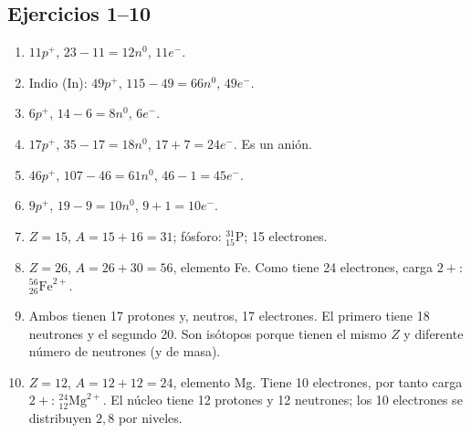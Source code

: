 \documentclass[12pt, letterpaper]{article}
\begin{document}
\subsection*{Ejercicios 1--10}
\begin{enumerate}[leftmargin=*, label=\textbf{\arabic*.}]
  \item $11p^+$, $23-11=12n^0$, $11e^-$.
  \item Indio (In): $49p^+$, $115-49=66n^0$, $49e^-$.
  \item $6p^+$, $14-6=8n^0$, $6e^-$.
  \item $17p^+$, $35-17=18n^0$, $17+7=24e^-$. Es un anión.
  \item $46p^+$, $107-46=61n^0$, $46-1=45e^-$.
  \item $9p^+$, $19-9=10n^0$, $9+1=10e^-$.
  \item $Z=15$, $A=15+16=31$; fósforo: $^{31}_{15}\mathrm{P}$; 15 electrones.
  \item $Z=26$, $A=26+30=56$, elemento Fe. Como tiene 24 electrones, carga $2+$: $^{56}_{26}\mathrm{Fe}^{2+}$.
  \item Ambos tienen 17 protones y, neutros, 17 electrones. El primero tiene 18 neutrones y el segundo 20. Son isótopos porque tienen el mismo $Z$ y diferente número de neutrones (y de masa).
  \item $Z=12$, $A=12+12=24$, elemento Mg. Tiene 10 electrones, por tanto carga $2+$: $^{24}_{12}\mathrm{Mg}^{2+}$. El núcleo tiene 12 protones y 12 neutrones; los 10 electrones se distribuyen $2,8$ por niveles.
\end{enumerate}
\end{document}
